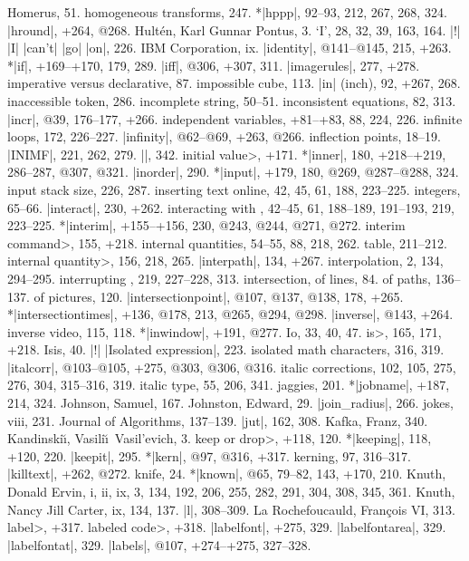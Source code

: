 Homerus, 51.
homogeneous transforms, 247.
*|hppp|, 92--93, 212, 267, 268, 324.
|hround|, +264, @268.
Hult\'en, Karl Gunnar Pontus, 3.
\newletter
`I', 28, 32, 39, 163, 164.
|!| |I| |can't| |go| |on|, 226.
IBM Corporation, ix.
|identity|, @141--@145, 215, +263.
*|if|, +169--+170, 179, 289.
|iff|, @306, +307, 311.
|imagerules|, 277, +278.
imperative versus declarative, 87.
impossible cube, 113.
|in| (inch), 92, +267, 268.
inaccessible token, 286.
incomplete string, 50--51.
inconsistent equations, 82, 313.
|incr|, @39, 176--177, +266.
independent variables, +81--+83, 88, 224, 226.
infinite loops, 172, 226--227.
|infinity|, @62--@69, +263, @266.
inflection points, 18--19.
|INIMF|, 221, 262, 279.
|\init|, 342.
\<initial value>, +171.
*|inner|, 180, +218--+219, 286--287, @307, @321.
|inorder|, 290.
*|input|, +179, 180, @269, @287--@288, 324.
input stack size, 226, 287.
inserting text online, 42, 45, 61, 188, 223--225.
integers, 65--66.
|interact|, 230, +262.
interacting with \MF, 42--45, 61, 188--189, 191--193, 219, 223--225.
*|interim|, +155--+156, 230, @243, @244, @271, @272.
\<interim command>, 155, +218.
internal quantities, 54--55, 88, 218, 262.
\sub table, 211--212.
\<internal quantity>, 156, 218, 265.
|interpath|, 134, +267.
interpolation, 2, 134, 294--295.
interrupting \MF, 219, 227--228, 313.
intersection, of lines, 84.
\sub of paths, 136--137.
\sub of pictures, 120.
|intersectionpoint|, @107, @137, @138, 178, +265.
*|intersectiontimes|, +136, @178, 213, @265, @294, @298.
|inverse|, @143, +264.
inverse video, 115, 118.
*|inwindow|, +191, @277.
Io, 33, 40, 47.
\<is>, 165, 171, +218.
Isis, 40.
|!| |Isolated expression|, 223.
isolated math characters, 316, 319.
|italcorr|, @103--@105, +275, @303, @306, @316.
italic corrections, 102, 105, 275, 276, 304, 315--316, 319.
italic type, 55, 206, 341.
\newletter
jaggies, 201.
*|jobname|, +187, 214, 324.
Johnson, Samuel, 167.
Johnston, Edward, 29.
|join_radius|, 266.
jokes, viii, 231.
Journal of Algorithms, 137--139.
|jut|, 162, 308.
\newletter
Kafka, Franz, 340.
Kandinski\u\i, Vasili\u\i\ Vasil'evich, 3.
\<keep or drop>, +118, 120.
*|keeping|, 118, +120, 220.
|keepit|, 295.
*|kern|, @97, @316, +317.
kerning, 97, 316--317.
|killtext|, +262, @272.
knife, 24.
*|known|, @65, 79--82, 143, +170, 210.
Knuth, Donald Ervin, i, ii, ix, 3, 134, 192, 206, 255, 282, 291, 304, 308, 345,
 361.
Knuth, Nancy Jill Carter, ix, 134, 137.
\newletter
|l|, 308--309.
La Rochefoucauld, Fran\c cois VI, 313.
\<label>, +317.
\<labeled code>, +318.
|labelfont|, +275, 329.
|labelfontarea|, 329.
|labelfontat|, 329.
|labels|, @107, +274--+275, 327--328.
